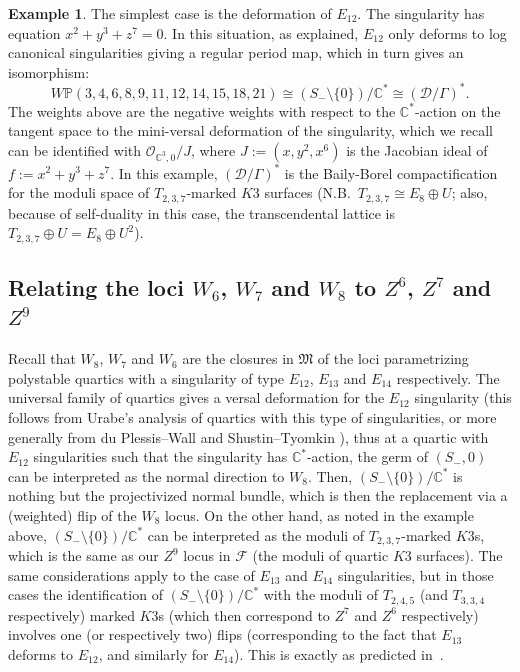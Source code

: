 \documentclass[11pt]{amsart}
\numberwithin{equation}{section}
\theoremstyle{plain}
\theoremstyle{remark}
\theoremstyle{definition}
\newtheorem{example}[theorem]{Example}
\newcommand{\bP}{\mathbb{P}}
\newcommand{\cF}{\mathscr{F}}
\newcommand{\bC}{\mathbb{C}}
\newcommand{\calO}{\mathcal{O}}
\newcommand{\sD}{\mathscr{D}}
\newcommand{\CC}{{\mathbb C}}
\newcommand{\gM}{\mathfrak{M}}
\begin{document}
 \begin{example}
The simplest case is the deformation of $E_{12}$. The singularity has equation $x^2+y^3+z^7=0$. In this situation, as explained, $E_{12}$ only deforms to log canonical singularities giving a regular period map, which in turn gives an isomorphism: 
%
$$W\bP(3,4,6,8,9,11,12,14,15,18,21)\cong \left(S_{-}\setminus \{0\}\right)/\bC^*\cong (\sD/\Gamma)^*.$$
%
The weights above are the negative weights with respect to the $\bC^*$-action on the tangent space to the mini-versal deformation of the singularity, which we recall can be identified with $\calO_{\CC^3,0}/J$, where $J:=(x,y^2,x^6)$ is the Jacobian ideal of $f:=x^2+y^3+z^7$.   In this example, $(\sD/\Gamma)^*$ is the Baily-Borel compactification for the moduli space of $T_{2,3,7}$-marked $K3$ surfaces (N.B.~$T_{2,3,7}\cong E_8\oplus U$; also, because of self-duality in this case, the transcendental lattice is $T_{2,3,7}\oplus U=E_8\oplus U^2$). 
\end{example}

\subsection{Relating the loci $W_6$, $W_7$ and $W_8$ to $Z^6$, $Z^7$ and $Z^9$}
%
Recall that  $W_8$, $W_7$ and $W_6$ are the closures in  $\gM$  of the loci parametrizing  polystable quartics with a singularity of type $E_{12}$, $E_{13}$ and $E_{14}$ respectively.
 The universal family of quartics gives a versal deformation for the $E_{12}$ singularity (this follows from Urabe's analysis  \cite{urabee12} of quartics with this type of singularities, or more generally from du Plessis--Wall \cite{dpw} and Shustin--Tyomkin \cite{shustin}), thus  at a quartic with $E_{12}$ singularities  such that the singularity has $\bC^*$-action, the germ of $(S_{-},0)$ can be interpreted as the normal direction to $W_8$. Then, $\left(S_{-}\setminus \{0\}\right)/\bC^*$ is nothing but the projectivized normal bundle, which is then the replacement via a (weighted) flip of the $W_8$ locus. On the other hand, as noted in the example above, $\left(S_{-}\setminus \{0\}\right)/\bC^*$ can be interpreted as the moduli of $T_{2,3,7}$-marked $K3$s, which is the same as our $Z^9$ locus in $\cF$ (the moduli of quartic $K3$ surfaces). The same considerations apply to the case of $E_{13}$ and $E_{14}$ singularities, but in those cases the identification of $\left(S_{-}\setminus \{0\}\right)/\bC^*$ with the moduli of $T_{2,4,5}$ (and $T_{3,3,4}$  respectively) marked $K3$s (which then correspond to $Z^7$ and $Z^6$ respectively) involves one (or respectively two) flips (corresponding to the fact that $E_{13}$ deforms to $E_{12}$, and similarly for $E_{14}$). This is  exactly as predicted in~\cite{log1}. 
\end{document}
